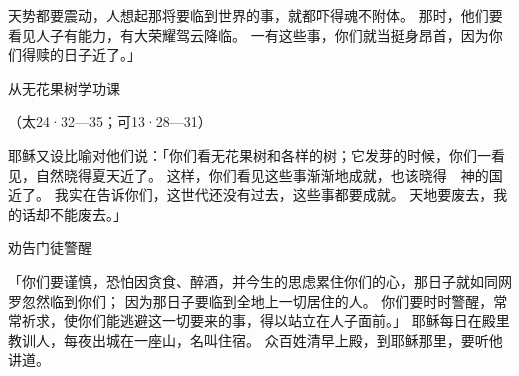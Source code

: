 {天势都要震动，人想起那将要临到世界的事，就都吓得魂不附体。
那时，他们要看见人子有能力，有大荣耀驾云降临。
一有这些事，你们就当挺身昂首，因为你们得赎的日子近了。」
\par }{\SH 从无花果树学功课
\par }{\R （太24·32—35；可13·28—31）
\par }{\PP {}耶稣又设比喻对他们说：「你们看无花果树和各样的树；它发芽的时候，你们一看见，自然晓得夏天近了。
这样，你们看见这些事渐渐地成就，也该晓得　神的国近了。
我实在告诉你们，这世代还没有过去，这些事都要成就。
天地要废去，我的话却不能废去。」
\par }{\SH 劝告门徒警醒
\par }{\PP {}「你们要谨慎，恐怕因贪食、醉酒，并今生的思虑累住你们的心，那日子就如同网罗忽然临到你们；
因为那日子要{}临到全地上一切居住的人。
你们要时时警醒，常常祈求，使你们能逃避这一切要来的事，得以站立在人子面前。」
耶稣每日在殿里教训人，每夜出城在一座山，名叫{}住宿。
众百姓清早上{}殿，到耶稣那里，要听他讲道。

}
